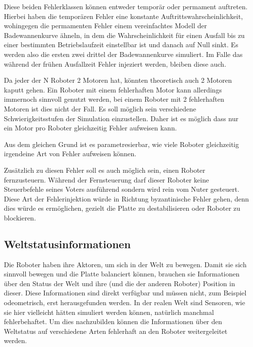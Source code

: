 Diese beiden Fehlerklassen k{\"{o}}nnen entweder tempor{\"{a}}r oder permament auftreten. Hierbei haben die tempor{\"{a}}ren Fehler
eine konstante Auftrittswahrscheinlichkeit, wohingegen die permamenten Fehler einem vereinfachtes Modell der Badewannenkurve {\"{a}}hneln,
in dem die Wahrscheinlichkeit  f{\"{u}}r einen Ausfall bis zu einer bestimmten Betriebslaufzeit einstellbar ist und danach auf Null sinkt.
Es werden also die ersten zwei drittel der Badewannenkurve simuliert. Im Falle das w{\"{a}}hrend der fr{\"{u}}hen Ausfallzeit Fehler
injeziert werden, bleiben diese auch.

Da jeder der \gls{N} Roboter 2 Motoren hat, k{\"{o}}nnten theoretisch auch 2 Motoren kaputt gehen. Ein Roboter mit einem fehlerhaften Motor kann allerdings immernoch sinnvoll genutzt werden,
bei einem Roboter mit 2 fehlerhaften Motoren ist dies nicht der Fall. Es soll m{\"{o}}glich sein verschiedene 
Schwierigkeitsstufen der Simulation einzustellen. Daher ist es m{\"{o}}glich
dass nur ein Motor pro Roboter gleichzeitig Fehler aufweisen kann.

Aus dem gleichen Grund ist es parametresierbar, wie viele Roboter gleichzeitig irgendeine Art von Fehler aufweisen k{\"{o}}nnen.

Zus{\"{a}}tzlich zu diesen Fehler soll es auch m{\"{o}}glich sein, einen Roboter fernzusteuern. W{\"{a}}hrend
der Fernsteuerung darf dieser Roboter keine Steuerbefehle seines Voters ausf{\"{u}}hrend sondern wird rein
vom Nuter gesteuert. Diese Art der Fehlerinjektion w{\"{u}}rde in Richtung byzantinische Fehler gehen,
denn dies w{\"{u}}rde es erm{\"{o}}glichen, gezielt die Platte zu destabilisieren oder Roboter zu
blockieren.

\subsection{Weltstatusinformationen}
Die Roboter haben ihre Aktoren, um sich in der Welt zu bewegen. Damit sie sich sinnvoll bewegen und die
Platte balanciert k{\"{o}}nnen, brauchen sie Informationen {\"{u}}ber den Status der Welt und ihre
(und die der anderen Roboter) Position in dieser. Diese Informationen sind direkt verf{\"{u}}gbar
und m{\"{u}}ssen nicht, zum Beispiel odeometrisch, erst herausgefunden werden. In der realen Welt sind
Sensoren, wie sie hier vielleicht h{\"{a}}tten simuliert werden k{\"{o}}nnen, nat{\"{u}}rlich manchmal 
fehlerbehaftet. Um dies nachzubilden k{\"{o}}nnen die Informationen {\"{u}}ber den Weltstatus auf
verschiedene Arten fehlerhaft an den Roboter weitergeleitet werden.

